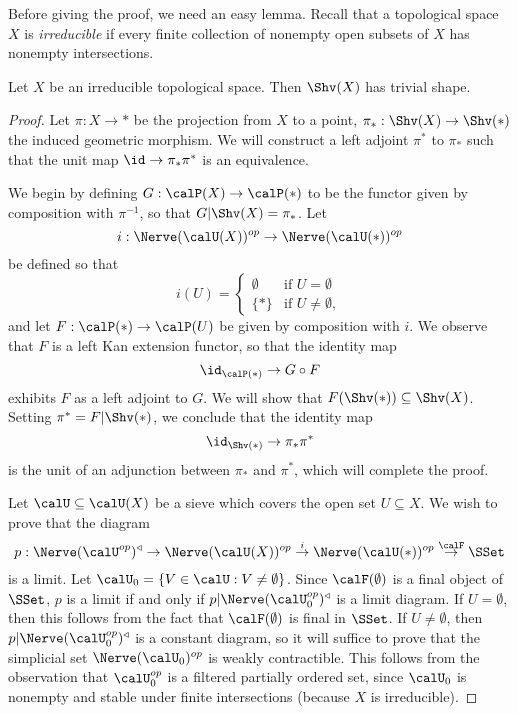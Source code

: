 Before giving the proof, we need an easy lemma.
Recall that a topological space $X$ is {\it irreducible} if every finite collection of nonempty open subsets of $X$ has nonempty intersections.

\begin{lemma}\label{silshape}
Let $X$ be an irreducible topological space. Then $\Shv(X)$ has trivial shape.
\end{lemma}

\begin{proof}
Let $\pi: X \rightarrow \ast$ be the projection from $X$ to a point, $\pi_{\ast}: \Shv(X) \rightarrow \Shv(\ast)$ the induced geometric morphism. We will construct a left adjoint $\pi^{\ast}$ to
$\pi_{\ast}$ such that the unit map $\id \rightarrow \pi_{\ast} \pi^{\ast}$ is an equivalence. 

We begin by defining $G: \calP(X) \rightarrow \calP(\ast)$ to be the functor
given by composition with $\pi^{-1}$, so that $G | \Shv(X) = \pi_{\ast}$. Let
$$i: \Nerve (\calU(X))^{op} \rightarrow \Nerve(\calU(\ast))^{op}$$
be defined so that
$$ i(U) = \begin{cases} \emptyset & \text{if } U = \emptyset \\
\{ \ast \} & \text{if } U \neq \emptyset, \end{cases}$$
and let $F: \calP(\ast) \rightarrow \calP(U)$ be given by composition with $i$.
We observe that $F$ is a left Kan extension functor, so that the identity map
$$ \id_{ \calP(\ast)} \rightarrow G \circ F$$
exhibits $F$ as a left adjoint to $G$. We will show that $F( \Shv(\ast) ) \subseteq \Shv(X)$.
Setting $\pi^{\ast} = F | \Shv(\ast)$, we conclude that the identity map
$$ \id_{ \Shv(\ast)} \rightarrow \pi_{\ast} \pi^{\ast} $$
is the unit of an adjunction between $\pi_{\ast}$ and $\pi^{\ast}$, which will complete the proof.

Let $\calU \subseteq \calU(X)$ be a sieve which covers the open set $U \subseteq X$.
We wish to prove that the diagram
$$p: \Nerve(\calU^{op})^{\triangleleft} \rightarrow \Nerve(\calU(X))^{op}
\stackrel{i}{\rightarrow} \Nerve(\calU(\ast))^{op} \stackrel{\calF}{\rightarrow} \SSet$$
is a limit. Let $\calU_0 = \{ V \in \calU: V \neq \emptyset \}$. Since
$\calF(\emptyset)$ is a final object of $\SSet$, $p$ is a limit if and only if
$p | \Nerve(\calU_0^{op})^{\triangleleft}$ is a limit diagram. If $U = \emptyset$,
then this follows from the fact that $\calF(\emptyset)$ is final in $\SSet$.
If $U \neq \emptyset$, then $p | \Nerve(\calU_0^{op})^{\triangleleft}$ is
a constant diagram, so it will suffice to prove that the simplicial set
$\Nerve(\calU_0)^{op}$ is weakly contractible. This follows from the observation
that $\calU_0^{op}$ is a filtered partially ordered set, since $\calU_0$ is nonempty and stable under finite intersections (because $X$ is irreducible). 
\end{proof}

